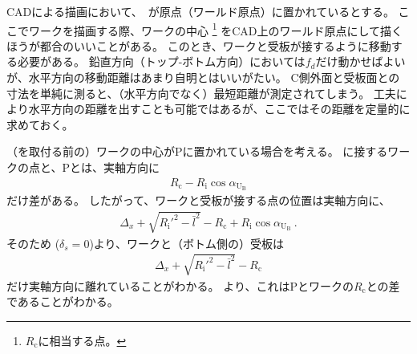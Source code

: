 

CADによる描画において、\TableCenter　が原点（ワールド原点）に置かれているとする。
ここでワークを描画する際、ワークの中心
\footnote{$R_\mathrm c$に相当する点。}\relax
をCAD上のワールド原点にして描くほうが都合のいいことがある。
このとき、ワークと受板が接するように移動する必要がある。
鉛直方向（トップ-ボトム方向）においては$f_d$だけ動かせばよいが、水平方向の移動距離はあまり自明とはいいがたい。
C側外面と受板面との寸法を単純に測ると、（水平方向でなく）最短距離が測定されてしまう。
工夫により水平方向の距離を出すことも可能ではあるが、ここではその距離を定量的に求めておく。



（\Spacer を取付る前の）ワークの中心が\TableCenter Pに置かれている場合を考える。
\BottomSideReceiverPlate に接するワークの点と、\TableCenter Pとは、実軸方向に
\begin{align*}
  R_\mathrm c-R_\mathrm i\cos\alpha_{\mathrm U_\mathrm B}
\end{align*}
だけ差がある。
したがって、ワークと受板が接する点の位置は実軸方向に、
\begin{align*}
  \Delta_x+\sqrt{R_\mathrm i'^2-\bar l^2}-R_\mathrm c+R_\mathrm i\cos\alpha_{\mathrm U_\mathrm B}\ .
\end{align*}
そのため ($\delta_s = 0$)より、ワークと（ボトム側の）受板は
\begin{align*}
  \Delta_x+\sqrt{R_\mathrm i'^2-\bar l^2}-R_\mathrm c
\end{align*}
だけ実軸方向に離れていることがわかる。
より、これは\TableCenter Pとワークの\CenterCurvature$R_\mathrm c$との差であることがわかる。



